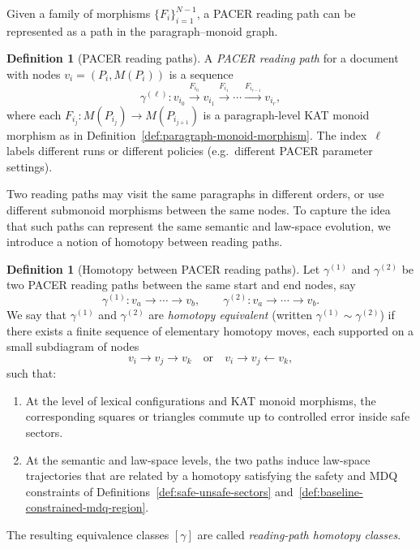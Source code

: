 \documentclass[11pt]{book}
\theoremstyle{plain}
\theoremstyle{definition}
\newtheorem{definition}[theorem]{Definition}
\theoremstyle{remark}
\begin{document}
Given a family of morphisms $\{F_i\}_{i=1}^{N-1}$, a PACER reading
path can be represented as a path in the paragraph–monoid graph.

\begin{definition}[PACER reading paths]
\label{def:pacer-reading-paths}
A \emph{PACER reading path} for a document with nodes
$v_i=(P_i,M(P_i))$ is a sequence
\[
  \gamma^{(\ell)}:
  v_{i_0}\xrightarrow{F_{i_0}}v_{i_1}\xrightarrow{F_{i_1}}\cdots
  \xrightarrow{F_{i_{r-1}}}v_{i_r},
\]
where each $F_{i_j}:M(P_{i_j})\to M(P_{i_{j+1}})$ is a
paragraph-level KAT monoid morphism as in
Definition~\ref{def:paragraph-monoid-morphism}. The index~$\ell$
labels different runs or different policies (e.g.\ different PACER
parameter settings).
\end{definition}

Two reading paths may visit the same paragraphs in different orders,
or use different submonoid morphisms between the same nodes. To
capture the idea that such paths can represent the same semantic and
law-space evolution, we introduce a notion of homotopy between
reading paths.

\begin{definition}[Homotopy between PACER reading paths]
\label{def:pacer-reading-path-homotopy}
Let $\gamma^{(1)}$ and $\gamma^{(2)}$ be two PACER reading paths
between the same start and end nodes, say
\[
  \gamma^{(1)}: v_a\to\cdots\to v_b,
  \qquad
  \gamma^{(2)}: v_a\to\cdots\to v_b.
\]
We say that $\gamma^{(1)}$ and $\gamma^{(2)}$ are \emph{homotopy
equivalent} (written $\gamma^{(1)}\sim\gamma^{(2)}$) if there exists a
finite sequence of elementary homotopy moves, each supported on a
small subdiagram of nodes
\[
  v_i\to v_j\to v_k
  \quad\text{or}\quad
  v_i\to v_j\leftarrow v_k,
\]
such that:
\begin{enumerate}
  \item At the level of lexical configurations and KAT monoid
        morphisms, the corresponding squares or triangles commute up
        to controlled error inside safe sectors.
  \item At the semantic and law-space levels, the two paths induce
        law-space trajectories that are related by a homotopy
        satisfying the safety and MDQ constraints of
        Definitions~\ref{def:safe-unsafe-sectors}
        and~\ref{def:baseline-constrained-mdq-region}.
\end{enumerate}
The resulting equivalence classes $[\gamma]$ are called
\emph{reading-path homotopy classes}.
\end{definition}
\end{document}
